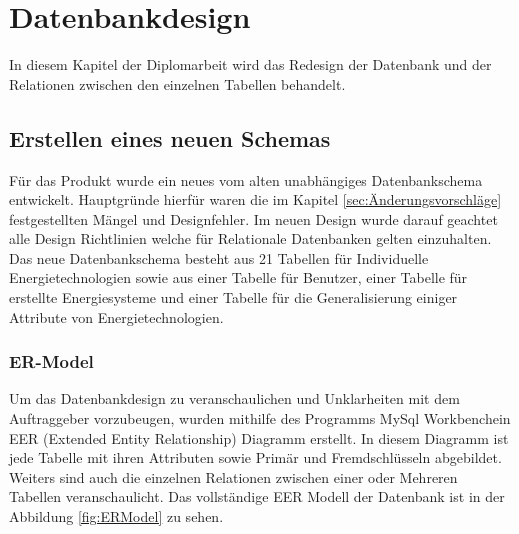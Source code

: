 \section{Datenbankdesign}
In diesem Kapitel der Diplomarbeit wird das Redesign der Datenbank und der Relationen zwischen den einzelnen Tabellen behandelt.


\subsection{Erstellen eines neuen Schemas}
Für das Produkt wurde ein neues vom alten unabhängiges Datenbankschema entwickelt. Hauptgründe hierfür waren die im Kapitel \ref{sec:Änderungsvorschläge} festgestellten Mängel und Designfehler. Im neuen Design wurde darauf geachtet alle Design Richtlinien welche für Relationale Datenbanken gelten einzuhalten. Das neue Datenbankschema besteht aus 21 Tabellen für Individuelle Energietechnologien sowie aus einer Tabelle für Benutzer, einer Tabelle für erstellte Energiesysteme und einer Tabelle für die Generalisierung einiger Attribute von Energietechnologien.

\subsubsection{ER-Model}
Um das Datenbankdesign zu veranschaulichen und Unklarheiten mit dem Auftraggeber vorzubeugen, wurden mithilfe des Programms \glqq MySql Workbench\grqq \space ein EER (Extended Entity Relationship) Diagramm erstellt. In diesem Diagramm ist jede Tabelle mit ihren Attributen sowie Primär und Fremdschlüsseln abgebildet. Weiters sind auch die einzelnen Relationen zwischen einer oder Mehreren Tabellen veranschaulicht. Das vollständige EER Modell der Datenbank ist in der Abbildung \ref{fig:ERModel} zu sehen.

